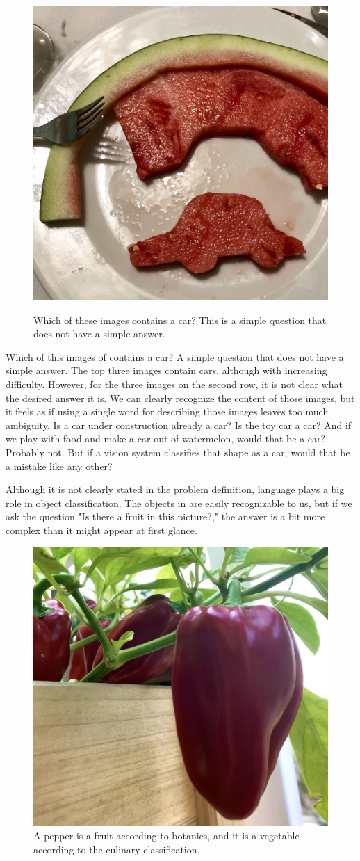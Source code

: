 \begin{figure}[t]
{\includegraphics[width=0.32\linewidth]{figures/object_recognition/IMG_9325.jpeg}
}
\caption{Which of these images contains a car? This is a simple question that does not have a simple answer.}
\label{fig:whatisacar}
\end{figure}


Which of this images of \fig{\ref{fig:whatisacar}} contains a car? A simple question that does not have a simple answer. The top three images contain cars, although with increasing difficulty. However, for the three images on the second row, it is not clear what the desired answer it is. We can clearly recognize the content of those images, but it feels as if using a single word for describing those images leaves too much ambiguity. Is a car under construction already a car? Is the toy car a car? And if we play with food and make a car out of watermelon, would that be a car? Probably not. But if a vision system classifies that shape as a car, would that be a mistake like any other? 

Although it is not clearly stated in the problem definition, language plays a big role in object classification. The objects in \fig{\ref{fig:object_recognition_pepper}} are easily recognizable to us, but if we ask the question "Is there a fruit in this picture?," the answer is a bit more complex than it might appear at first glance.


\begin{figure}[h]
\centerline{
\includegraphics[width=0.32\linewidth]{figures/object_recognition/pepper.jpg}
}
\caption{A pepper is a fruit according to botanics, and it is a vegetable according to the culinary classification.}
\label{fig:object_recognition_pepper}
\end{figure}

